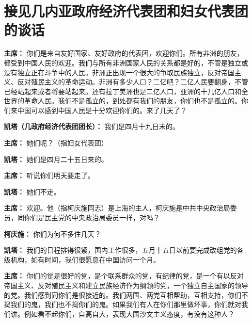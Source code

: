 \section[接见几内亚政府经济代表团和妇女代表团的谈话（一九六二年五月三日）]{接见几内亚政府经济代表团和妇女代表团的谈话}

\begin{duihua}
\item[\textbf{主席：}] 你们是来自友好国家、友好政府的代表团，欢迎你们。所有非洲的朋友，都受到中国人民的欢迎。我们与所有非洲国家人民的关系都是好的，不管是独立或没有独立正在斗争中的人民。非洲正出现一个很大的争取民族独立，反对帝国主义、反对殖民主义的革命运动。非洲有多少人口？二亿吧？二亿人民要翻身，不管已经站起来或者将要站起来。还有拉丁美洲也是二亿人口，亚洲的十几亿人口和全世界的革命人民。我们不是孤立的，到处都有我们的朋友，你们也不是孤立的。你们来中国可以感到中国人民是十分欢迎你们的。来了几天了？

\item[\textbf{凯塔（几政府经济代表团团长）：}] 我们是四月十九日末的。

\item[\textbf{主席：}] 她们呢？（指妇女代表团）

\item[\textbf{凯塔：}] 她们是四月二十五日来的。

\item[\textbf{主席：}] 听说你们明天要走了。

\item[\textbf{凯塔：}] 她们不走。

\item[\textbf{主席：}] 欢迎。他（指柯庆施同志）是上海的主人，柯庆施是中共中央政治局委员，同你们是民主党的中央政治局委员一样，对吗？

\item[\textbf{柯庆施：}] 你们为何不多住几天？

\item[\textbf{凯塔：}] 我们的日程排得很紧，国内工作很多，五月十五日以前要完成改组党的各级机构，如有时间，我们很愿意在中国访问一个月。

\item[\textbf{主席：}] 你们的觉是很好的党，是个联系群众的党，有纪律的党，是一个有以反对帝国主义、反对殖民主义和建立民族经济作为纲领的党，一个独立自主国家的领导的党。我们感到同你们是很接近的。我们两国、两党互相帮助，互相支持，你们不捣我们的鬼，我们也不捣你们的鬼。如果我们有人在你们那里做坏事，你们就对我们讲。例如看不起你们，自高自大，表现大国沙文主义态度，有没有这种人？


\end{duihua}
